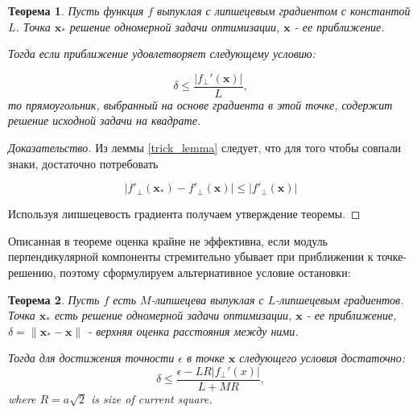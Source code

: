 \documentclass[12pt]{article}
\newtheorem{theorem}{Теорема}[section]
\begin{document}
\begin{theorem}
\label{CurGrad}
Пусть функция $f$ выпуклая с липшецевым градиентом с константой $L$. Точка $\textbf{x}_*$ решение одномерной задачи оптимизации, $\textbf{x}$ - ее приближение.

Тогда если приближение удовлетворяет следующему условию:

$$\delta \leq \frac{|f_\perp'(\textbf{x})|}{L},$$
то прямоугольник, выбранный на основе градиента в этой точке, содержит решение исходной задачи на квадрате. 
\end{theorem}
\begin{proof}[Доказательство]

Из леммы \ref{trick_lemma} следует, что для того чтобы совпали знаки, достаточно потребовать

$$\left|f'_\perp(\textbf{x}_*) - f'_\perp(\textbf{x})\right| \leq |f'_\perp(\textbf{x})|$$

Используя липшецевость градиента получаем утверждение теоремы.
\end{proof}

Описанная в теореме оценка крайне не эффективна, если модуль перпендикулярной компоненты стремительно убывает при приближении к точке-решению, поэтому сформулируем альтернативное условие остановки:

\begin{theorem}
\label{small}
Пусть $f$ есть $M$-липшецева выпуклая с $L$-липшецевым градиентов. Точка $\textbf{x}_*$ есть решение одномерной задачи оптимизации, $\textbf{x}$ - ее приближение, $\delta = \|\textbf{x}_*-\textbf{x}\|$ - верхняя оценка расстояния между ними.

Тогда для достижения точности $\epsilon$ в точке $\textbf{x}$ следующего условия достаточно:
$$\delta \leq \frac{\epsilon-LR|f_\perp'(x)|}{L+MR}, $$
where $R=a\sqrt{2}$ is size of current square.
\end{theorem}
\end{document}
